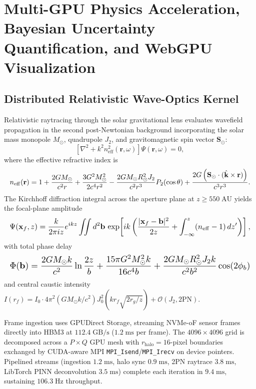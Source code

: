 \documentclass[10pt,twocolumn]{IEEEtran}
\begin{document}
\section{Multi-GPU Physics Acceleration, Bayesian Uncertainty Quantification, and WebGPU Visualization}
\label{sec:gpu_uq_vis}

\subsection{Distributed Relativistic Wave-Optics Kernel}
\label{sec:gpu_physics}

Relativistic raytracing through the solar gravitational lens evaluates
wavefield propagation in the second post-Newtonian background
incorporating the solar mass monopole $M_\odot$, quadrupole $J_2$, and
gravitomagnetic spin vector $\mathbf{S}_\odot$:
\begin{equation}
\left[\nabla^{2}+k^{2}n_{\mathrm{eff}}^{2}(\mathbf{r},\omega)\right]
\Psi(\mathbf{r},\omega)=0,
\label{eq:wave_2pn_full}
\end{equation}
where the effective refractive index is
\begin{equation}
\resizebox{\columnwidth}{!}{$\displaystyle
n_{\mathrm{eff}}(\mathbf{r})=1+\frac{2GM_\odot}{c^{2}r}
+\frac{3G^{2}M_\odot^{2}}{2c^{4}r^{2}}
-\frac{2GM_\odot R_\odot^{2}J_2}{c^{2}r^{3}}P_2(\cos\theta)
+\frac{2G\left(\mathbf{S}_\odot\cdot(\hat{\mathbf{k}}\times\mathbf{r})\right)}
{c^{3}r^{3}}.$}
\label{eq:n_eff_2pn}
\end{equation}
The Kirchhoff diffraction integral across the aperture plane at
$z\geq550\;\mathrm{AU}$ yields the focal-plane amplitude
\begin{equation}
\resizebox{\columnwidth}{!}{$\displaystyle
\Psi(\mathbf{x}_f,z)=\frac{k}{2\pi iz}e^{ikz}\iint d^{2}\mathbf{b}\,
\exp\!\left[ik\left(\frac{|\mathbf{x}_f-\mathbf{b}|^{2}}{2z}
+\int_{-\infty}^{z}(n_{\mathrm{eff}}-1)\,dz'\right)\right],$}
\label{eq:kirchhoff_2pn}
\end{equation}
with total phase delay
\begin{equation}
\resizebox{\columnwidth}{!}{$\displaystyle
\Phi(\mathbf{b})=\frac{2GM_\odot k}{c^{2}}\ln\frac{2z}{b}
+\frac{15\pi G^{2}M_\odot^{2}k}{16c^{4}b}
+\frac{2GM_\odot R_\odot^{2}J_2 k}{c^{2}b^{2}}\cos(2\phi_b)$}
\label{eq:phase_delay_2pn}
\end{equation}
and central caustic intensity $I(r_f)=I_0\cdot4\pi^{2}(GM_\odot k/c^{2})
J_0^{2}(kr_f\sqrt{2r_g/z})+\mathcal{O}(J_2,\mathrm{2PN})$.

Frame ingestion uses GPUDirect Storage, streaming NVMe-oF sensor frames
directly into HBM3 at $112.4\;\mathrm{GB/s}$ ($1.2\;\mathrm{ms}$ per
frame).  The $4096\times4096$ grid is decomposed across a $P\times Q$
GPU mesh with $r_{\mathrm{halo}}=16$-pixel boundaries exchanged by
CUDA-aware MPI \texttt{MPI\_Isend}/\texttt{MPI\_Irecv} on device
pointers.  Pipelined streams (ingestion $1.2\;\mathrm{ms}$, halo sync
$0.9\;\mathrm{ms}$, 2PN raytrace $3.8\;\mathrm{ms}$, LibTorch PINN
deconvolution $3.5\;\mathrm{ms}$) complete each iteration in
$9.4\;\mathrm{ms}$, sustaining $106.3\;\mathrm{Hz}$ throughput.
\end{document}
